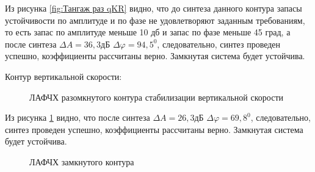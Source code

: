 Из рисунка \ref{fig:Тангаж раз qKR} видно, что до синтеза данного контура запасы устойчивости по амплитуде и по фазе не удовлетворяют заданным требованиям, то есть запас по амплитуде меньше 10 дб и запас по фазе меньше 45 град, а после синтеза $\Delta A = 36,3 $дБ $\Delta \varphi = 94,5^0$, следовательно, синтез проведен успешно, коэффициенты рассчитаны верно. Замкнутая система будет устойчива.  

\begin{center}
    Контур вертикальной скорости:
\end{center}

\begin{figure}[H]
    \caption{ЛАФЧХ разомкнутого контура стабилизации вертикальной скорости}
    \label{fig:Вертикальная скорость раз qKR}
\end{figure}

Из рисунка \ref{fig:Вертикальная скорость раз qKR} видно, что после синтеза $\Delta A = 26,3 $дБ $\Delta \varphi = 69,8^0$, следовательно, синтез проведен успешно, коэффициенты рассчитаны верно. Замкнутая система будет устойчива.  

\begin{figure}[H]
    \caption{ЛАФЧХ замкнутого контура }
    \label{fig:Вертикальная скорость зам qKR}
\end{figure}

